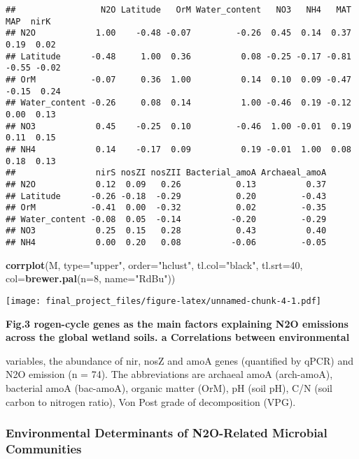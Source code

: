\documentclass[
]{article}
\newenvironment{Shaded}{\begin{snugshade}}{\end{snugshade}}
\newcommand{\AttributeTok}[1]{\textcolor[rgb]{0.13,0.29,0.53}{#1}}
\newcommand{\DecValTok}[1]{\textcolor[rgb]{0.00,0.00,0.81}{#1}}
\newcommand{\FunctionTok}[1]{\textcolor[rgb]{0.13,0.29,0.53}{\textbf{#1}}}
\newcommand{\NormalTok}[1]{#1}
\newcommand{\StringTok}[1]{\textcolor[rgb]{0.31,0.60,0.02}{#1}}
\begin{document}
\begin{verbatim}
##                 N2O Latitude   OrM Water_content   NO3   NH4   MAT   MAP  nirK
## N2O            1.00    -0.48 -0.07         -0.26  0.45  0.14  0.37  0.19  0.02
## Latitude      -0.48     1.00  0.36          0.08 -0.25 -0.17 -0.81 -0.55 -0.02
## OrM           -0.07     0.36  1.00          0.14  0.10  0.09 -0.47 -0.15  0.24
## Water_content -0.26     0.08  0.14          1.00 -0.46  0.19 -0.12  0.00  0.13
## NO3            0.45    -0.25  0.10         -0.46  1.00 -0.01  0.19  0.11  0.15
## NH4            0.14    -0.17  0.09          0.19 -0.01  1.00  0.08  0.18  0.13
##                nirS nosZI nosZII Bacterial_amoA Archaeal_amoA
## N2O            0.12  0.09   0.26           0.13          0.37
## Latitude      -0.26 -0.18  -0.29           0.20         -0.43
## OrM           -0.41  0.00  -0.32           0.02         -0.35
## Water_content -0.08  0.05  -0.14          -0.20         -0.29
## NO3            0.25  0.15   0.28           0.43          0.40
## NH4            0.00  0.20   0.08          -0.06         -0.05
\end{verbatim}

\begin{Shaded}
\begin{Highlighting}[]
\FunctionTok{corrplot}\NormalTok{(M, }\AttributeTok{type=}\StringTok{"upper"}\NormalTok{, }\AttributeTok{order=}\StringTok{"hclust"}\NormalTok{, }\AttributeTok{tl.col=}\StringTok{"black"}\NormalTok{, }\AttributeTok{tl.srt=}\DecValTok{40}\NormalTok{,}
         \AttributeTok{col=}\FunctionTok{brewer.pal}\NormalTok{(}\AttributeTok{n=}\DecValTok{8}\NormalTok{, }\AttributeTok{name=}\StringTok{"RdBu"}\NormalTok{))}
\end{Highlighting}
\end{Shaded}

\texttt{[image: final\_project\_files/figure-latex/unnamed-chunk-4-1.pdf]}

\textbf{Fig.3 rogen-cycle genes as the main factors explaining N2O
emissions across the global wetland soils. a Correlations between
environmental}

variables, the abundance of nir, nosZ and amoA genes (quantified by
qPCR) and N2O emission (n = 74). The abbreviations are archaeal amoA
(arch-amoA), bacterial amoA (bac-amoA), organic matter (OrM), pH (soil
pH), C/N (soil carbon to nitrogen ratio), Von Post grade of
decomposition (VPG).

\hypertarget{environmental-determinants-of-n2o-related-microbial-communities}{%
\subsubsection{\texorpdfstring{\textbf{Environmental Determinants of
N2O-Related Microbial
Communities}}{Environmental Determinants of N2O-Related Microbial Communities}}\label{environmental-determinants-of-n2o-related-microbial-communities}}
\end{document}
